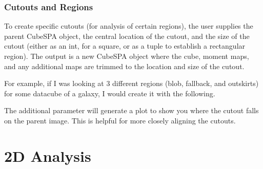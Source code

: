 \documentclass[letterpaper,10pt,english]{sphinxmanual}
\begin{document}
\subsection{Cutouts and Regions}
\label{\detokenize{getting_started:cutouts-and-regions}}
\sphinxAtStartPar
To create specific cutouts (for analysis of certain regions), the user supplies the parent CubeSPA object,
the central location of the cutout, and the size of the cutout (either as an int, for a square, or as a
tuple to establish a rectangular region). The output is a new CubeSPA object where the cube, moment maps,
and any additional maps are trimmed to the location and size of the cutout.

\sphinxAtStartPar
For example, if I was looking at 3 different regions (blob, fallback, and outskirts) for some datacube of a
galaxy, I would create it with the following.

\begin{sphinxVerbatim}[commandchars=\\\{\}]
      
       
       
\end{sphinxVerbatim}

\sphinxAtStartPar
The additional parameter  will generate a plot to show you where the cutout falls on the parent
image. This is helpful for more closely aligning the cutouts.


\chapter{2D Analysis}
\label{\detokenize{index:d-analysis}}
\sphinxstepscope
\end{document}
